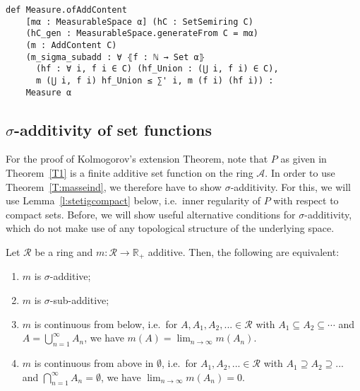 \documentclass[lean]{DraftAFM}
\begin{document}


\begin{verbatim}
def Measure.ofAddContent
    [mα : MeasurableSpace α] (hC : SetSemiring C)
    (hC_gen : MeasurableSpace.generateFrom C = mα)
    (m : AddContent C)
    (m_sigma_subadd : ∀ ⦃f : ℕ → Set α⦄
      (hf : ∀ i, f i ∈ C) (hf_Union : (⋃ i, f i) ∈ C),
      m (⋃ i, f i) hf_Union ≤ ∑' i, m (f i) (hf i)) :
    Measure α
\end{verbatim}

\subsection{$\sigma$-additivity of set functions}
For the proof of Kolmogorov's extension Theorem, note that $P$ as
given in Theorem~\ref{T1} is a finite additive set function on the
ring $\mathcal A$. In order to use Theorem~\ref{T:masseind}, we
therefore have to show $\sigma$-additivity. For this, we will use
Lemma~\ref{l:stetigcompact} below, i.e.\ inner regularity of $P$ with
respect to compact sets. Before, we will show useful alternative
conditions for $\sigma$-additivity, which do not make use of any
topological structure of the underlying space.

\begin{lemma}\label{P:stetigmass}
  Let $\mathcal R$ be a ring and $m:\mathcal R\to \mathbb R_+$
  additive. Then, the following are equivalent:
  \begin{enumerate}
    \item $m$ is $\sigma$-additive;
    \item $m$ is $\sigma$-sub-additive;
    \item $m$ is continuous from below, i.e.\ for $A, A_1, A_2,... \in
      \mathcal R$ with $A_1 \subseteq A_2 \subseteq \cdots$ and $A =
      \bigcup_{n=1}^\infty A_n$, we have $m(A) = \lim_{n\to\infty}
      m(A_n)$.
    \item $m$ is continuous from above in $\emptyset$, i.e.\ for $A_1,
      A_2,...\in\mathcal R$ with $A_1 \supseteq A_2 \supseteq ...$ and
      $\bigcap_{n=1}^\infty A_n = \emptyset$, we have
      $\lim_{n\to\infty} m(A_n)=0$.
  \end{enumerate}
\end{lemma}
\end{document}
